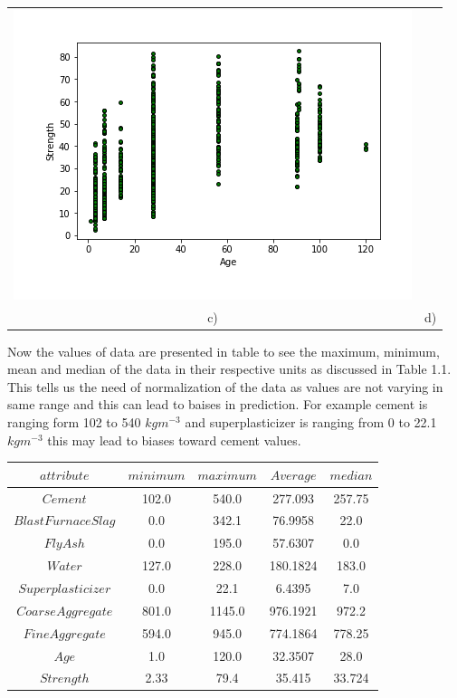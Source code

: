 \begin{center}
\begin{tabular}{cc}
        \includegraphics[scale=0.5]{images/Plot_08.png}\\
        c) & d)\\
    \end{tabular}
\end{center}

Now the values of data are presented in table to see the maximum, minimum, mean and median of the data in their respective units as discussed in Table 1.1. This tells us the need of normalization of the data as values are not varying in same range and this can lead to baises in prediction. For example cement is ranging form 102 to 540 $kgm^{-3}$ and superplasticizer is ranging from 0 to 22.1 $kgm^{-3}$ this may lead to biases toward cement values.
\begin{center}
    \begin{tabular}{|c|c|c|c|c|}
    	\hline
        $attribute$ & $minimum$ & $maximum$ & $Average$ & $median$\\
        \hline
        $Cement$ & 102.0 & 540.0 & 277.093 & 257.75\\
        \hline
        $Blast Furnace Slag$ & 0.0 & 342.1 & 76.9958 & 22.0\\
        \hline
        $Fly Ash$ & 0.0 & 195.0 & 57.6307 & 0.0\\
        \hline
        $Water$ & 127.0 & 228.0 & 180.1824 & 183.0\\
        \hline
        $Superplasticizer$ & 0.0 & 22.1 & 6.4395 & 7.0\\
        \hline
        $Coarse Aggregate$ & 801.0 & 1145.0 & 976.1921 & 972.2\\
        \hline
        $Fine Aggregate$ & 594.0 & 945.0 & 774.1864 & 778.25\\
        \hline
        $Age$ & 1.0 & 120.0 & 32.3507 & 28.0\\
        \hline
        $Strength$ & 2.33 & 79.4 & 35.415 & 33.724\\
        \hline
    \end{tabular}
\end{center}

